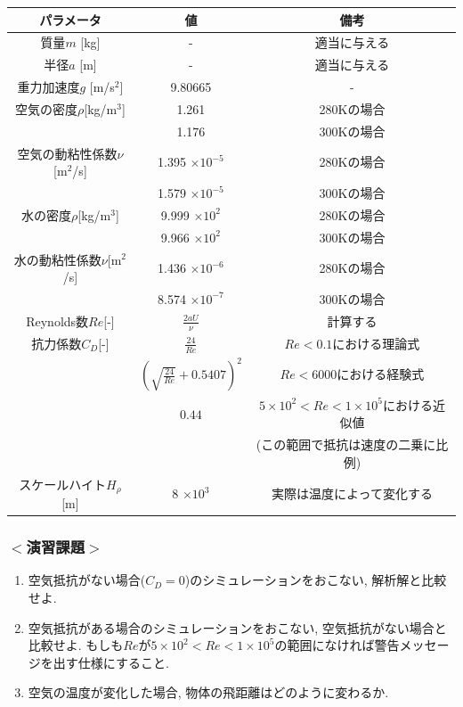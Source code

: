 \documentclass[a4j]{jsarticle}
\begin{document}
\begin{table}[h]
\centering
\begin{tabular}{ccc}
\hline
パラメータ & 値 & 備考 \\
\hline
質量$m$ [kg] & - & 適当に与える \\ \hline
半径$a$ [m] & - & 適当に与える \\ \hline
重力加速度$g$ [m/s$^2$] & 9.80665 & - \\ \hline
空気の密度$\rho$[kg/m$^3$] & 1.261 & 280Kの場合 \\
 & 1.176 & 300Kの場合 \\ \hline
空気の動粘性係数$\nu$[m$^2$/s] & 1.395 $\times 10^{-5}$ & 280Kの場合 \\
 & 1.579 $\times 10^{-5}$ & 300Kの場合 \\ \hline
水の密度$\rho$[kg/m$^3$] & 9.999 $\times 10^2$ & 280Kの場合 \\
 & 9.966 $\times 10^2$ & 300Kの場合 \\ \hline
水の動粘性係数$\nu$[m$^2$/s] & 1.436 $\times 10^{-6}$ & 280Kの場合 \\
 & 8.574 $\times 10^{-7}$ & 300Kの場合 \\ \hline
Reynolds数$Re$[-] & $\frac{2aU}{\nu}$ & 計算する \\ \hline
抗力係数$C_D$[-] & $\frac{24}{Re}$ & $Re<0.1$における理論式 \\
& $(\sqrt{\frac{24}{Re}}+0.5407)^2$ & $Re< 6000$における経験式 \\
& $0.44$ & $5 \times 10^2 < Re < 1 \times 10^5$における近似値　\\
& & (この範囲で抵抗は速度の二乗に比例) \\ \hline
スケールハイト$H_\rho$[m] & 8 $\times 10^3$ & 実際は温度によって変化する \\ \hline
\end{tabular}
\end{table}
\fi %

\subsubsection*{$<$演習課題$>$}
\begin{enumerate}
\item 空気抵抗がない場合($C_D=0$)のシミュレーションをおこない, 解析解と比較せよ. 
\item 空気抵抗がある場合のシミュレーションをおこない, 空気抵抗がない場合と比較せよ. 
もしも$Re$が$5 \times 10^2 < Re < 1 \times 10^5$の範囲になければ警告メッセージを出す仕様にすること. 
\item 空気の温度が変化した場合, 物体の飛距離はどのように変わるか. 
\end{enumerate}
\end{document}
